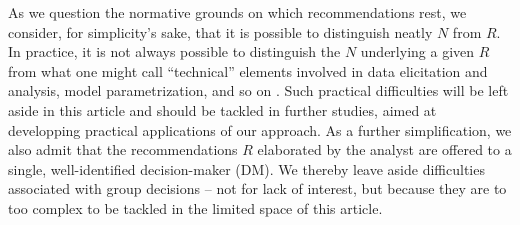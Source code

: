 \documentclass[preprint, french, english, 11pt, authoryear]{elsarticle}%
\begin{document}
As we question the normative grounds on which recommendations rest, we consider, for simplicity's sake, that it is possible to distinguish neatly $N$ from $R$. In practice, it is not always possible to distinguish the $N$ underlying a given $R$ from what one might call ``technical'' elements involved in data elicitation and analysis, model parametrization, and so on \citep{baujard_value_2013}. Such practical difficulties will be left aside in this article and should be tackled in further studies, aimed at developping practical applications of our approach. As a further simplification, we also admit that the recommendations $R$ elaborated by the analyst are offered to a single, well-identified decision-maker (\ac{DM}). We thereby leave aside difficulties associated with group decisions -- not for lack of interest, but because they are to too complex to be tackled in the limited space of this article.
\end{document}
